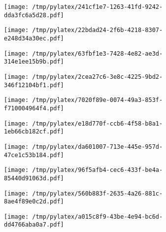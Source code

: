 \documentclass{article}
\begin{document}
\begin{figure}[htbp]
\begin{subfigure}[b]{.3\linewidth}
\texttt{[image: /tmp/pylatex/241cf1e7-1263-41fd-9242-dda3fc6a5d28.pdf]}
\end{subfigure}
\begin{subfigure}[b]{.3\linewidth}
\texttt{[image: /tmp/pylatex/22bdad24-2f6b-4218-8307-e248d34a30ec.pdf]}
\end{subfigure}
\begin{subfigure}[b]{.3\linewidth}
\texttt{[image: /tmp/pylatex/63fbf1e3-7428-4e82-ae3d-314e1ee15b9b.pdf]}
\end{subfigure}
\begin{subfigure}[b]{.3\linewidth}
\texttt{[image: /tmp/pylatex/2cea27c6-3e8c-4225-9bd2-346f12104bf1.pdf]}
\end{subfigure}
\begin{subfigure}[b]{.3\linewidth}
\texttt{[image: /tmp/pylatex/7020f89e-0074-49a3-853f-f710004964f4.pdf]}
\end{subfigure}
\begin{subfigure}[b]{.3\linewidth}
\texttt{[image: /tmp/pylatex/e18d770f-ccb6-4f58-b8a1-1eb66cb182cf.pdf]}
\end{subfigure}
\begin{subfigure}[b]{.3\linewidth}
\texttt{[image: /tmp/pylatex/da601007-713e-445e-957d-47ce1c53b184.pdf]}
\end{subfigure}
\begin{subfigure}[b]{.3\linewidth}
\texttt{[image: /tmp/pylatex/96f5afb4-cec6-433f-be4a-85440d91063d.pdf]}
\end{subfigure}
\begin{subfigure}[b]{.3\linewidth}
\texttt{[image: /tmp/pylatex/560b883f-2635-4a26-881c-8ae4f89e0c2d.pdf]}
\end{subfigure}
\begin{subfigure}[b]{.3\linewidth}
\texttt{[image: /tmp/pylatex/a015c8f9-43be-4e94-bc6d-dd4766aba0a7.pdf]}
\end{subfigure}
\end{figure}
\end{document}
